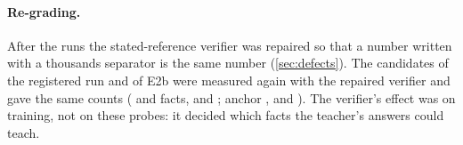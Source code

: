 \paragraph{Re-grading.} After the runs the stated-reference verifier was repaired so that a number
written with a thousands separator is the same number (\cref{sec:defects}). The candidates of the
registered run and of E2b were measured again with the repaired verifier and gave the same counts
(\mETworRegradeCandidateGZeroGZero{} and \mETworRegradeCandidateGOneGOne{} facts, and
\mETwobRegradeCandidateGZeroGZero{}; anchor \mETworRegradeCandidateGZeroAnchor, \mETworRegradeCandidateGOneAnchor{} and
\mETwobRegradeCandidateGZeroAnchor). The verifier's effect was on training, not on these probes:
it decided which facts the teacher's answers could teach.
